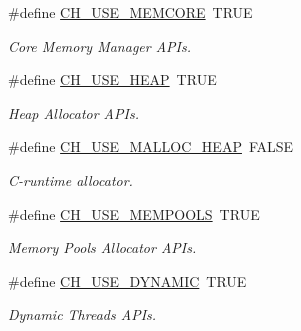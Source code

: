 \begin{DoxyCompactItemize}
\#define \hyperlink{group__config_gaff85f4d919dac30a337ce2f34e2fa1af}{C\+H\+\_\+\+U\+S\+E\+\_\+\+M\+E\+M\+C\+O\+R\+E}~T\+R\+U\+E
\begin{DoxyCompactList}\small\item\em Core Memory Manager A\+P\+Is. \end{DoxyCompactList}\item 
\#define \hyperlink{group__config_gaaeb266ab6131572f1d8f164bddf2da3f}{C\+H\+\_\+\+U\+S\+E\+\_\+\+H\+E\+A\+P}~T\+R\+U\+E
\begin{DoxyCompactList}\small\item\em Heap Allocator A\+P\+Is. \end{DoxyCompactList}\item 
\#define \hyperlink{group__config_ga4785d390f3a787916c5a5c41e953577d}{C\+H\+\_\+\+U\+S\+E\+\_\+\+M\+A\+L\+L\+O\+C\+\_\+\+H\+E\+A\+P}~F\+A\+L\+S\+E
\begin{DoxyCompactList}\small\item\em C-\/runtime allocator. \end{DoxyCompactList}\item 
\#define \hyperlink{group__config_gac456517b37f104d2226fef50310c79f8}{C\+H\+\_\+\+U\+S\+E\+\_\+\+M\+E\+M\+P\+O\+O\+L\+S}~T\+R\+U\+E
\begin{DoxyCompactList}\small\item\em Memory Pools Allocator A\+P\+Is. \end{DoxyCompactList}\item 
\#define \hyperlink{group__config_gaae4996e24bbee7d66528671cec8b8749}{C\+H\+\_\+\+U\+S\+E\+\_\+\+D\+Y\+N\+A\+M\+I\+C}~T\+R\+U\+E
\begin{DoxyCompactList}\small\item\em Dynamic Threads A\+P\+Is. \end{DoxyCompactList}\end{DoxyCompactItemize}
